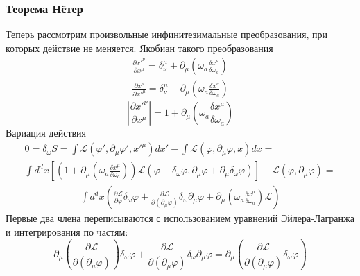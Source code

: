 \documentclass[a4paper,12pt]{article}
\theoremstyle{definition}
\theoremstyle{definition}
\theoremstyle{definition}
\begin{document}
\subsubsection*{Теорема Нётер}
\label{sec:noether}

Теперь рассмотрим произвольные инфинитезимальные преобразования, при которых действие не меняется.
Якобиан такого преобразования
\begin{eqnarray*}
  \frac{\partial x'^{\nu}}{\partial x^{\mu}} = \delta^{\mu}_{\nu}+\partial_{\mu}\left(\omega_a \frac{\delta x^{\nu}}{\delta \omega_a}\right)\\
  \frac{\partial x^{\nu}}{\partial x'^{\mu}} = \delta^{\mu}_{\nu}-\partial_{\mu}\left(\omega_a \frac{\delta x^{\nu}}{\delta \omega_a}\right)
\end{eqnarray*}
\begin{equation*}
  \left|\frac{\partial x'^{\nu}}{\partial x^{\mu}}\right| = 1+\partial_{\mu}\left(\omega_a \frac{\delta x^{\mu}}{\delta \omega_a}\right)
\end{equation*}
Вариация действия
\begin{multline*}
  0=\delta_{\omega} S=\int \mathcal{L}(\varphi',\partial_{\mu}\varphi',x'^{\mu})dx'-\int \mathcal{L}(\varphi,\partial_{\mu}\varphi,x)dx=\\
  \int d^{d}x\left[ \left( 1+\partial_{\mu}\left(\omega_a \frac{\delta x^{\mu}}{\delta \omega_a}\right)\right) \mathcal{L} \left(\varphi+\delta_{\omega}\varphi,
    \partial_{\mu}\varphi+\partial_{\mu}\delta_{\omega}\varphi\right)\right]-\mathcal{L}(\varphi,\partial_{\mu}\varphi)=
\end{multline*}
\begin{multline*}
      \int d^{d}x\left( \frac{\partial \mathcal{L}}{\partial \varphi} \delta_{\omega}\varphi +\frac{\partial \mathcal{L}}{\partial(\partial_{\mu}\varphi)}\delta_{\omega}\partial_{\mu}\varphi +\partial_{\mu}\left(\omega_a \frac{\delta x^{\mu}}{\delta \omega_a}\right)\mathcal{L}\right)
\end{multline*}
Первые два члена переписываются с использованием уравнений Эйлера-Лагранжа и интегрирования по частям:
\begin{equation*}
  \partial_{\mu}\left(\frac{\partial \mathcal{L}}{\partial (\partial_{\mu}\varphi)}\right)\delta_{\omega}\varphi+\frac{\partial \mathcal{L}}{\partial (\partial_{\mu}\varphi)}\delta_{\omega}\partial_{\mu}\varphi=
    \partial_{\mu}\left(\frac{\partial \mathcal{L}}{\partial(\partial_{\mu}\varphi)}\delta_{\omega}\varphi\right)
\end{equation*}
\end{document}
